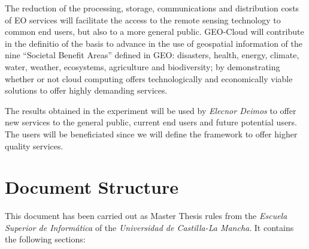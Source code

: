 The reduction of the processing, storage, communications and distribution costs
of \ac{EO} services will facilitate the access to the remote sensing technology to
common end users, but also to a more general public. GEO-Cloud will contribute
in the definitio of the basis to advance in the use of geospatial information of the nine
``Societal Benefit Areas'' defined in GEO: disasters, health, energy, climate,
water, weather, ecosystems, agriculture and biodiversity; by demonstrating
whether or not cloud computing offers technologically and economically viable
solutions to offer highly demanding services.

The results obtained in the experiment will be used by \emph{Elecnor Deimos} to offer new
services to the general public, current end users and future potential users. The users will be beneficiated since we will define the framework to
offer higher quality services.




\section{Document Structure}

This document has been carried out as Master Thesis rules from the \emph{Escuela
Superior de Informática} of the \emph{Universidad de Castilla-La Mancha}. It contains
the following sections:


